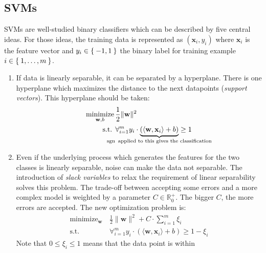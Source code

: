 \documentclass[technote,a4paper,leqno]{IEEEtran}
\DeclareMathOperator{\sgn}{sgn}
\DeclareMathOperator*{\minimize}{minimize}
\begin{document}
\subsection{SVMs}\label{subsec:trad-SVM}%
\Glspl{SVM} are well-studied binary classifiers which can be described by five
central ideas. For those ideas, the training data is represented as
$(\mathbf{x}_i, y_i)$ where $\mathbf{x}_i$ is the feature vector and $y_i \in
\Set{-1, 1}$ the binary label for training example $i \in \Set{1, \dots, m}$.
\begin{enumerate}
    \item If data is linearly separable, it can be separated by a hyperplane.
          There is one hyperplane which maximizes the distance to the next
          datapoints (\textit{support vectors}). This hyperplane should be
          taken:\\
          \begin{equation*}
          \begin{aligned}
              \minimize_{\mathbf{w}, b}\,&\frac{1}{2} \|\mathbf{w}\|^2\\
              \text{s.t. }& \forall_{i=1}^m y_i \cdot \underbrace{(\langle \mathbf{w}, \mathbf{x}_i\rangle + b)}_{\mathclap{\sgn \text{ applied to this gives the classification}}} \geq 1
          \end{aligned}
          \end{equation*}
    \item Even if the underlying process which generates the features for the
          two classes is linearly separable, noise can make the data not
          separable. The introduction of \textit{slack variables} to relax the
          requirement of linear separability solves this problem. The trade-off
          between accepting some errors and a more complex model is weighted by
          a parameter $C \in \mathbb{R}_0^+$. The bigger $C$, the more errors
          are accepted. The new optimization problem is:
          \begin{equation*}
          \begin{aligned}
              \minimize_{\mathbf{w}}\,&\frac{1}{2} \|\mathbf{w}\|^2 + C \cdot \sum_{i=1}^m \xi_i\\
              \text{s.t. }& \forall_{i=1}^m y_i \cdot (\langle \mathbf{w}, \mathbf{x}_i\rangle + b) \geq 1 - \xi_i
          \end{aligned}
          \end{equation*}
          Note that \(0 \le \xi_i \le 1\) means that the data point is within

\end{enumerate}
\end{document}
